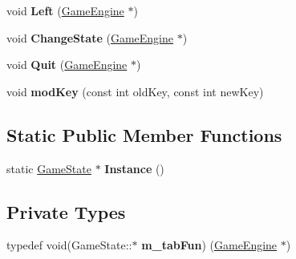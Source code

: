 \begin{DoxyCompactItemize}
\item 
\hypertarget{class_game_state_a11552becc1deb36e11a353a616794b01}{}void {\bfseries Left} (\hyperlink{class_game_engine}{Game\+Engine} $\ast$)\label{class_game_state_a11552becc1deb36e11a353a616794b01}

\item 
\hypertarget{class_game_state_adc6cf96a01e569902c67abb963213678}{}void {\bfseries Change\+State} (\hyperlink{class_game_engine}{Game\+Engine} $\ast$)\label{class_game_state_adc6cf96a01e569902c67abb963213678}

\item 
\hypertarget{class_game_state_a29a17a0ec8fc89bef8bc968cc68e9cf5}{}void {\bfseries Quit} (\hyperlink{class_game_engine}{Game\+Engine} $\ast$)\label{class_game_state_a29a17a0ec8fc89bef8bc968cc68e9cf5}

\item 
\hypertarget{class_game_state_a0692b2a0a1455581954211630c33d0a1}{}void {\bfseries mod\+Key} (const int old\+Key, const int new\+Key)\label{class_game_state_a0692b2a0a1455581954211630c33d0a1}

\end{DoxyCompactItemize}
\subsection*{Static Public Member Functions}
\begin{DoxyCompactItemize}
\item 
\hypertarget{class_game_state_ab20134f651b40f415cd1501c8fcc97f8}{}static \hyperlink{class_game_state}{Game\+State} $\ast$ {\bfseries Instance} ()\label{class_game_state_ab20134f651b40f415cd1501c8fcc97f8}

\end{DoxyCompactItemize}
\subsection*{Private Types}
\begin{DoxyCompactItemize}
\item 
\hypertarget{class_game_state_abc6ae3b9b70f8ca3a3bf96dbbd2a459c}{}typedef void(Game\+State\+::$\ast$ {\bfseries m\+\_\+tab\+Fun}) (\hyperlink{class_game_engine}{Game\+Engine} $\ast$)\label{class_game_state_abc6ae3b9b70f8ca3a3bf96dbbd2a459c}

\end{DoxyCompactItemize}
